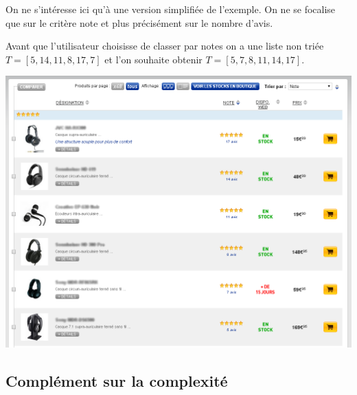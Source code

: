\begin{exemple2}

\begin{minipage}{0.6\textwidth}
On ne s'intéresse ici qu'à une version simplifiée de l'exemple. On ne se focalise que sur le critère note et plus précisément sur le nombre d'avis.

Avant que l'utilisateur choisisse de classer par notes on a une liste non triée $T=[5,14,11,8,17,7]$ et l'on souhaite obtenir $T=[5,7,8,11,14,17]$.

\end{minipage}
\begin{minipage}{0.35\textwidth}
\begin{center}
\includegraphics[width=.9\textwidth]{images/illustration.png}
\end{center}
\end{minipage}







\end{exemple2}



\subsection{Complément sur la complexité}

